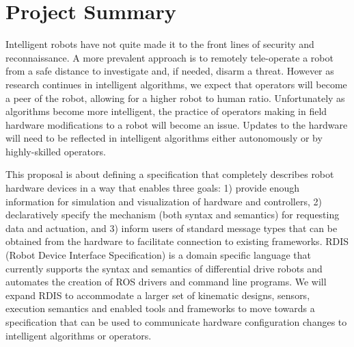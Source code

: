 
\section*{\vspace{-2em}\center Project Summary}

Intelligent robots have not quite made it to the front lines of security and reconnaissance.  A more prevalent approach is to remotely tele-operate a robot from a safe distance to investigate and, if needed, disarm a threat.  However as research continues in intelligent algorithms, we expect that operators will become a peer of the robot, allowing for a higher robot to human ratio.  Unfortunately as algorithms become more intelligent, the practice of operators making in field hardware modifications to a robot will become an issue.  Updates to the hardware will need to be reflected in intelligent algorithms either autonomously or by highly-skilled operators.  

This proposal is about defining a specification that completely describes robot hardware devices in a way that enables three goals: 1) provide enough information for simulation and visualization of hardware and controllers, 2) declaratively specify the mechanism (both syntax and semantics) for requesting data and actuation, and 3) inform users of standard message types that can be obtained from the hardware to facilitate connection to existing frameworks.  RDIS (Robot Device Interface Specification) is a domain specific language that currently supports the syntax and semantics of differential drive robots and automates the creation of ROS drivers and command line programs.  We will expand RDIS to accommodate a larger set of kinematic designs, sensors, execution semantics and enabled tools and frameworks to move towards a specification that can be used to communicate hardware configuration changes to intelligent algorithms or operators. 

%
%  

